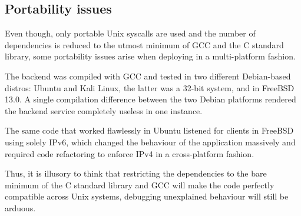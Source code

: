\subsection{Portability issues}
Even though, only portable Unix syscalls are used and the number of dependencies is reduced to the utmost minimum of GCC and the C standard library, some portability issues arise when deploying in a multi-platform fashion.

The backend was compiled with GCC and tested in two different Debian-based distros: Ubuntu and Kali Linux, the latter was a 32-bit system, and in FreeBSD 13.0. A single compilation difference between the two Debian platforms rendered the backend service completely useless in one instance. 


The same code that worked flawlessly in Ubuntu listened for clients in FreeBSD using solely IPv6, which changed the behaviour of the application massively and required code refactoring to enforce IPv4 in a cross-platform fashion.

Thus, it is illusory to think that restricting the dependencies to the bare minimum of the C standard library and GCC will make the code perfectly compatible across Unix systems, debugging unexplained behaviour will still be arduous.